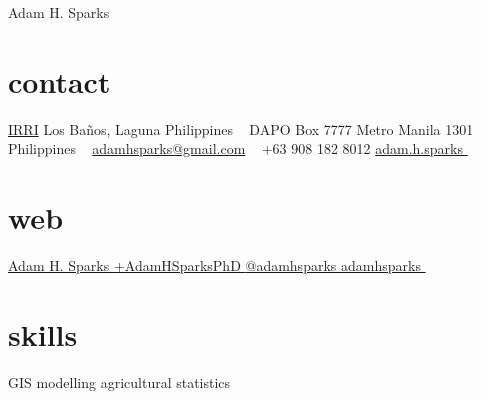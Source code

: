 
\hfill {\Huge Adam H. Sparks}

\begin{aside}
\small{\section{contact}
\href{http://www.irri.org/}{IRRI}
Los Ba\~nos, Laguna
Philippines
~
DAPO Box 7777
Metro Manila
1301 Philippines
~
\href{mailto:adamhsparks@gmail.com}{adamhsparks@gmail.com}
~
+63 908 182 8012  \faMobilePhone
{\href{skype:adam.h.sparks?call}{adam.h.sparks }}
~
\section{web}
\href{https://ph.linkedin.com/pub/adam-sparks/8b/b96/507}{Adam H. Sparks {\color{linkedin}\FA {}}}
\href{https://plus.google.com/+AdamHSparksPhD}{+AdamHSparksPhD {\color{google.plus}\FA {}}}
\href{https://www.twitter.com/adamhsparks/}{@adamhsparks {\color{twitter.blue}\faTwitter}}
\href{https://github.com/adamhsparks/}{adamhsparks \faGithub}
~
\section{skills}
GIS
modelling
agricultural statistics}
\end{aside}

